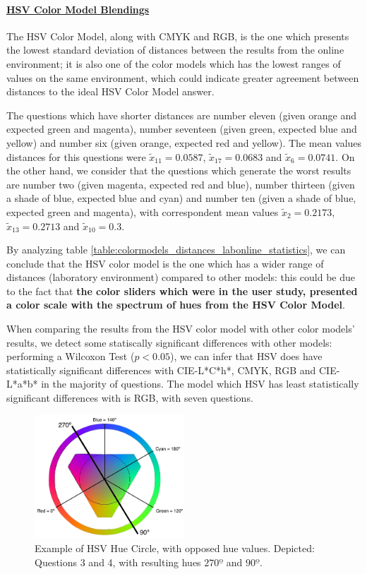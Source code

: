 \paragraph{\ul{HSV Color Model Blendings}} \par
\label{par:hsvcolormodel}
%
The HSV Color Model, along with CMYK and RGB, is the one which presents the lowest standard deviation of distances between the results from the online environment; it is also one of the color models which has
the lowest ranges of values on the same environment, which could indicate greater agreement between distances to the ideal HSV Color Model answer. \par
%
The questions which have shorter distances are number eleven (given orange and expected green and magenta), number seventeen (given green, expected blue and yellow) and number six (given orange,
expected red and yellow). The mean values distances for this questions were $\tilde{x}_{11} = 0.0587$, $\tilde{x}_{17} = 0.0683$ and $\tilde{x}_{6} = 0.0741$.
On the other hand, we consider that the questions which generate the worst results are number two (given magenta, expected red and blue), number thirteen (given a shade of blue, expected blue and cyan) and number
ten (given a shade of blue, expected green and magenta), with correspondent mean values $\tilde{x}_{2} = 0.2173$, $\tilde{x}_{13} = 0.2713$ and
$\tilde{x}_{10} = 0.3$. \par
%
By analyzing table \ref{table:colormodels_distances_labonline_statistics}, we can conclude that the HSV color model is the one which has a wider range of distances (laboratory environment) compared to other models:
this could be due to the fact that \textbf{the color sliders which were in the user study, presented a color scale with the spectrum of hues from the HSV Color Model}. \par
%
When comparing the results from the HSV color model with other color models' results, we detect some statiscally significant differences with other models: performing a Wilcoxon Test ($p < 0.05$), we can infer that HSV does
have statistically significant differences with CIE-L*C*h*, CMYK, RGB and CIE-L*a*b* in the majority of questions. The model which HSV has least statistically significant differences with is RGB, with seven questions. \par
%
\begin{figure}[!htbp]
  \centering
  \includegraphics[width=0.5\textwidth]{images/HSV_hue.png}
  \caption[Example of HSV Hue Circle, with opposed hue values.]{Example of HSV Hue Circle, with opposed hue values. Depicted: Questions 3 and 4, with resulting hues $270º$ and $90º$.}
  \label{fig:hsvcircles_example}
\end{figure}
